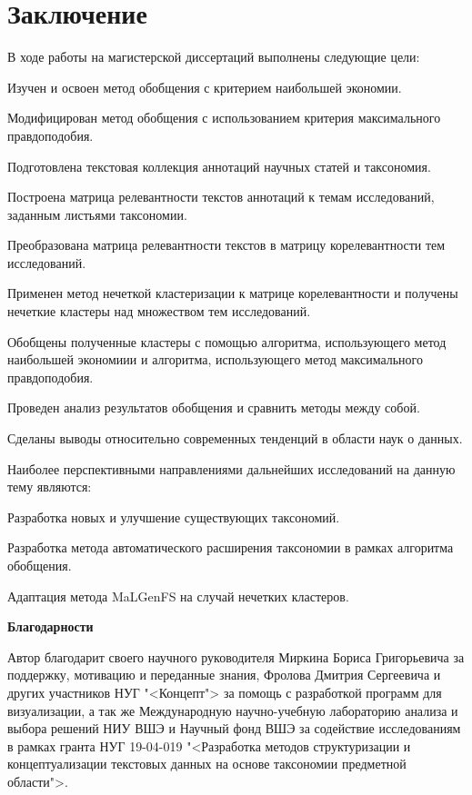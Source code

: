 \documentclass[12pt]{article}
\newenvironment{itemize*}%
{\begin{itemize}%
	\setlength{\itemsep}{0pt}%
	\setlength{\parskip}{0pt}}%
{\end{itemize}}
\let\oldsection\section
\renewcommand{\section}{\clearpage\oldsection}
\begin{document}
\section{Заключение}

В ходе работы на магистерской диссертаций выполнены следующие цели:

\begin{itemize*}
	\item Изучен и освоен метод обобщения с критерием наибольшей экономии.
	\item Модифицирован метод обобщения с использованием критерия максимального правдоподобия.
	\item Подготовлена текстовая коллекция аннотаций научных статей и таксономия.
	\item Построена матрица релевантности текстов аннотаций к темам исследований, заданным листьями таксономии.
	\item Преобразована матрица релевантности текстов в матрицу корелевантности тем исследований.
	\item Применен метод нечеткой кластеризации к матрице корелевантности и получены нечеткие кластеры над множеством тем исследований.
	\item Обобщены полученные кластеры с помощью алгоритма, использующего метод наибольшей экономиии и алгоритма, использующего метод максимального правдоподобия.
	\item Проведен анализ результатов обобщения и сравнить методы между собой.
	\item Сделаны выводы относительно современных тенденций в области наук о данных.
\end{itemize*}

Наиболее перспективными направлениями дальнейших исследований на данную тему являются:

\begin{itemize*}
	\item Разработка новых и улучшение существующих таксономий.
	\item Разработка метода автоматического расширения таксономии в рамках алгоритма обобщения.
	\item Адаптация метода MaLGenFS на случай нечетких кластеров.
\end{itemize*}


\noindent\textbf{Благодарности}

Автор благодарит своего научного руководителя Миркина Бориса Григорьевича за поддержку, мотивацию и переданные знания, Фролова Дмитрия Сергеевича и других участников НУГ "<Концепт"> за помощь с разработкой программ для визуализации, а так же Международную научно-учебную лабораторию анализа и выбора решений НИУ ВШЭ и Научный фонд ВШЭ за содействие исследованиям в рамках гранта НУГ 19-04-019 "<Разработка методов структуризации и концептуализации текстовых данных на основе таксономии предметной области">.
\clearpage
\nocite{*}
 

\end{document}

